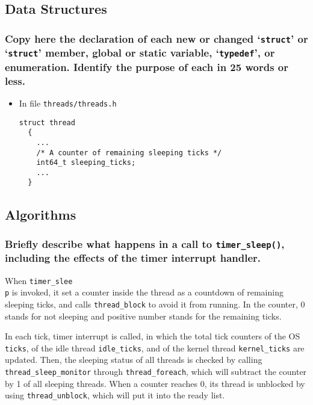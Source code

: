 \documentclass[sigconf, nonacm]{acmart}
\begin{document}
        \label{Alarm Clock}
    
        \subsection{Data Structures}
        
            \subsubsection{Copy here the declaration of each new or changed `\texttt{struct}' or `\texttt{struct}' member, global or static variable, `\texttt{typedef}', or enumeration. Identify the purpose of each in 25 words or less. } 
            
                \begin{itemize}
                    \item In file \texttt{threads/threads.h}
\begin{verbatim}
struct thread
  {
    ...
    /* A counter of remaining sleeping ticks */
    int64_t sleeping_ticks;
    ...
  }\end{verbatim}
                \end{itemize}
        
        \subsection{Algorithms}
        
            \subsubsection{Briefly describe what happens in a call to \texttt{timer\_sleep()}, including the effects of the timer interrupt handler. }
                When \texttt{timer\_slee\\p} is invoked, it set a counter inside the thread as a countdown of remaining sleeping ticks, and calls \texttt{thread\_block} to avoid it from running. In the counter, 0 stands for not sleeping and positive number stands for the remaining ticks.
            
                In each tick, timer interrupt is called, in which the total tick counters of the OS \texttt{ticks}, of the idle thread \texttt{idle\_ticks}, and of the kernel thread \texttt{kernel\_ticks} are updated. Then, the sleeping status of all threads is checked by calling \texttt{thread\_sleep\_monitor} through \texttt{thread\_foreach}, which will subtract the counter by 1 of all sleeping threads. When a counter reaches 0, its thread is unblocked by using \texttt{thread\_unblock}, which will put it into the ready list. 
            
\end{document}
